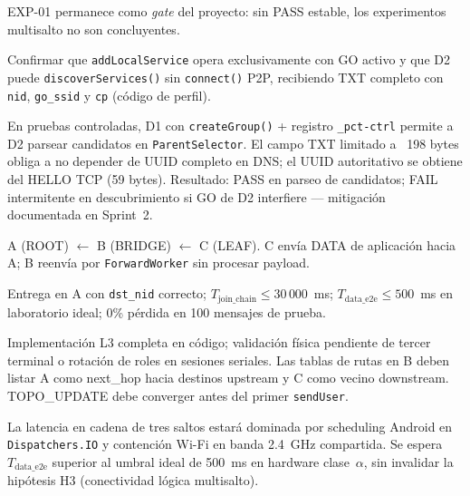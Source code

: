 EXP-01 permanece como \emph{gate} del proyecto: sin PASS estable, los experimentos multisalto no son concluyentes.



Confirmar que \texttt{addLocalService} opera exclusivamente con GO activo y que D2 puede \texttt{discoverServices()} sin \texttt{connect()} P2P, recibiendo TXT completo con \texttt{nid}, \texttt{go\_ssid} y \texttt{cp} (código de perfil).


En pruebas controladas, D1 con \texttt{createGroup()} + registro \texttt{\_pct-ctrl} permite a D2 parsear candidatos en \texttt{ParentSelector}. El campo TXT limitado a ~198 bytes obliga a no depender de UUID completo en DNS; el UUID autoritativo se obtiene del HELLO TCP (59 bytes). Resultado: PASS en parseo de candidatos; FAIL intermitente en descubrimiento si GO de D2 interfiere — mitigación documentada en Sprint~2.



A (ROOT) $\leftarrow$ B (BRIDGE) $\leftarrow$ C (LEAF). C envía DATA de aplicación hacia A; B reenvía por \texttt{ForwardWorker} sin procesar payload.


Entrega en A con \texttt{dst\_nid} correcto; $T_{\mathrm{join\_chain}} \leq 30\,000$~ms; $T_{\mathrm{data\_e2e}} \leq 500$~ms en laboratorio ideal; 0\% pérdida en 100 mensajes de prueba.


Implementación L3 completa en código; validación física pendiente de tercer terminal o rotación de roles en sesiones seriales. Las tablas de rutas en B deben listar A como next\_hop hacia destinos upstream y C como vecino downstream. TOPO\_UPDATE debe converger antes del primer \texttt{sendUser}.


La latencia en cadena de tres saltos estará dominada por scheduling Android en \texttt{Dispatchers.IO} y contención Wi-Fi en banda 2.4~GHz compartida. Se espera $T_{\mathrm{data\_e2e}}$ superior al umbral ideal de 500~ms en hardware clase~$\alpha$, sin invalidar la hipótesis H3 (conectividad lógica multisalto).

